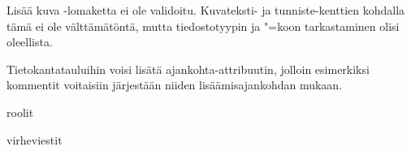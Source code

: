 \documentclass[finnish,colorlinks,headings=normal,parskip=half,footsepline]{scrartcl}
\begin{document}
Lisää kuva -lomaketta ei ole validoitu. Kuvateksti- ja tunniste-kenttien kohdalla tämä ei ole välttämätöntä, mutta tiedostotyypin ja "=koon tarkastaminen olisi oleellista.

Tietokantatauluihin voisi lisätä ajankohta-attribuutin, jolloin esimerkiksi kommentit voitaisiin järjestään niiden lisäämisajankohdan mukaan.

roolit

virheviestit
\end{document}
